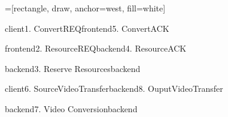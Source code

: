 \documentclass[tikz, border={-5.75pt 0 0 0}]{standalone}
\begin{document}
\begin{sequencediagram}[font=\scriptsize]
	\def\unitfactor{0.7}
	=[rectangle, draw, anchor=west, fill=white]
	
	
	\begin{call}{client}{1. ConvertREQ}{frontend}{5. ConvertACK}
		\begin{call}{frontend}{2. ResourceREQ}{backend}{4. ResourceACK}
			\begin{call}{backend}{3. Reserve Resources}{backend}{}
			\end{call}
		\end{call}
	\end{call}
	
	\begin{call}{client}{6. SourceVideoTransfer}{backend}{8. OuputVideoTransfer}
	\begin{call}{backend}{7. Video Conversion}{backend}{}
	\end{call}
	\end{call}
	
\end{sequencediagram}
\end{document}
